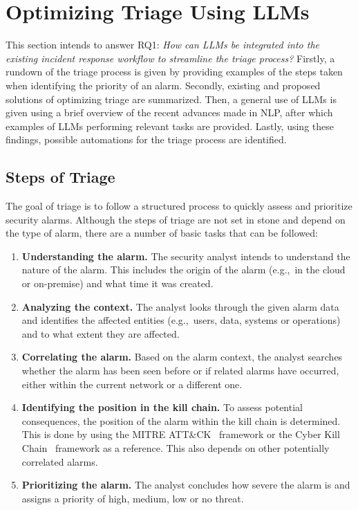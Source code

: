 \section{Optimizing Triage Using LLMs}
\label{sec:rq1}

This section intends to answer RQ1: \textit{How can LLMs be integrated into the existing incident response workflow to
streamline the triage process?}
Firstly, a rundown of the triage process is given by providing examples of the steps taken when identifying the priority
of an alarm.
Secondly, existing and proposed solutions of optimizing triage are summarized.
Then, a general use of LLMs is given using a brief overview of the recent advances made in NLP, after which examples
of LLMs performing relevant tasks are provided.
Lastly, using these findings, possible automations for the triage process are identified.

\subsection{Steps of Triage}
\label{subsec:rq1-steps-of-triage}

The goal of triage is to follow a structured process to quickly assess and prioritize security alarms.
Although the steps of triage are not set in stone and depend on the type of alarm, there are a number of basic tasks
that can be followed:
\begin{enumerate}
    \item \textbf{Understanding the alarm.}
    The security analyst intends to understand the nature of the alarm.
    This includes the origin of the alarm (e.g.,\ in the cloud or on-premise) and what time it was created.
    \item \textbf{Analyzing the context.}
    The analyst looks through the given alarm data and identifies the affected entities (e.g.,\ users, data, systems or
    operations) and to what extent they are affected.
    \item \textbf{Correlating the alarm.}
    Based on the alarm context, the analyst searches whether the alarm has been seen before or if related alarms have
    occurred, either within the current network or a different one.
    \item \textbf{Identifying the position in the kill chain.}
    To assess potential consequences, the position of the alarm within the kill chain is determined.
    This is done by using the MITRE ATT\&CK\ \citep{strom2018mitre} framework or the Cyber Kill
    Chain\ \citep{lockheed2011ckc} framework as a reference.
    This also depends on other potentially correlated alarms.
    \item \textbf{Prioritizing the alarm.}
    The analyst concludes how severe the alarm is and assigns a priority of high, medium, low or no threat.
\end{enumerate}


